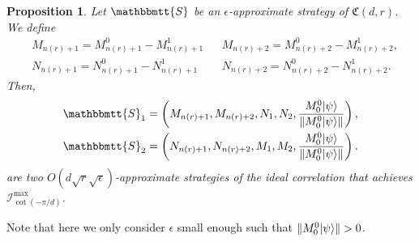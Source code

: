 \documentclass[11pt,letterpaper]{article}
\newcommand{\ket}[1]{|#1\rangle}
\DeclarePairedDelimiter{\norm}{\lVert}{\rVert}
\newcommand{\1}{\mathbb{1}}
\newcommand{\nr}{n(r)}
\newcommand{\fC}{\mathfrak{C}}
\newcommand{\bS}{\mathbbmtt{S}}
\newcommand{\I}{\mathcal{I}}
\newcommand{\ep}{\epsilon}
\newcommand{\se}{\sqrt{\epsilon}}
\newcommand{\sr}{\sqrt{r}}
\newtheorem{proposition}[theorem]{Proposition}
\theoremstyle{definition}
\begin{document}
\begin{proposition}
	\label{prop:s1s2}
	Let $\bS$ be an $\ep$-approximate strategy of $\fC(d,r)$. We define
	\begin{align}
		&M_{\nr+1} = M_{\nr+1}^0 - M_{\nr+1}^1  && 
		M_{\nr+2} = M_{\nr+2}^0 - M_{\nr+2}^1,\\
		&N_{\nr+1} = N_{\nr+1}^0 - N_{\nr+1}^1  && 
		N_{\nr+2} = N_{\nr+2}^0 - N_{\nr+2}^1.
	\end{align}
	Then,
	\begin{align}
		\bS_1 = \left(M_{\nr+1}, M_{\nr+2}, N_1, N_2, \frac{M_0^0\ket{\psi}}{\norm{M_0^0\ket{\psi}}}\right),\\
		\bS_2 = \left(N_{\nr+1}, N_{\nr+2}, M_1, M_2, \frac{M_0^0\ket{\psi}}{\norm{M_0^0\ket{\psi}}}\right).
	\end{align}
	are two $O(d \sr \se)$-approximate strategies of the ideal correlation that achieves $\I_{\cot(-\pi/d)}^{\max}$.
\end{proposition}
Note that here we only consider $\ep$ small enough such that 
$\norm{M_0^0\ket{\psi}} > 0$.
\end{document}
